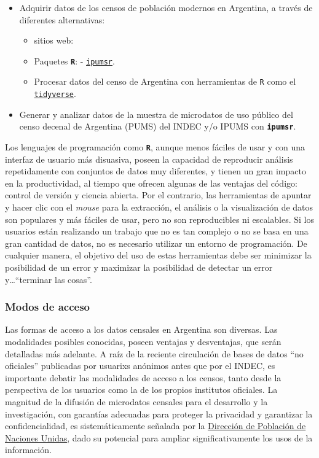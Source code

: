 \documentclass[
]{article}
\providecommand{\tightlist}{%
  \setlength{\itemsep}{0pt}\setlength{\parskip}{0pt}}
\begin{document}
\begin{itemize}
\tightlist
\item
  Adquirir datos de los censos de población modernos en Argentina, a través de diferentes alternativas:

  \begin{itemize}
  \tightlist
  \item
    sitios web:
  \item
    Paquetes \textbf{\texttt{R}}: - \href{https://cran.r-project.org/web/packages/ipumsr/vignettes/ipums.html}{\texttt{ipumsr}}.
  \item
    Procesar datos del censo de Argentina con herramientas de \texttt{R} como el \href{https://www.tidyverse.org/}{\texttt{tidyverse}}.
  \end{itemize}
\item
  Generar y analizar datos de la muestra de microdatos de uso público del censo decenal de Argentina (PUMS) del INDEC y/o IPUMS con \textbf{\texttt{ipumsr}}.
\end{itemize}

Los lenguajes de programación como \textbf{\texttt{R}}, aunque menos fáciles de usar y con una interfaz de usuario más disuasiva, poseen la capacidad de reproducir análisis repetidamente con conjuntos de datos muy diferentes, y tienen un gran impacto en la productividad, al tiempo que ofrecen algunas de las ventajas del código: control de versión y ciencia abierta. Por el contrario, las herramientas de apuntar y hacer clic con el \emph{mouse} para la extracción, el análisis o la visualización de datos son populares y más fáciles de usar, pero no son reproducibles ni escalables. Si los usuarios están realizando un trabajo que no es tan complejo o no se basa en una gran cantidad de datos, no es necesario utilizar un entorno de programación. De cualquier manera, el objetivo del uso de estas herramientas debe ser minimizar la posibilidad de un error y maximizar la posibilidad de detectar un error y\ldots{}``terminar las cosas''.

\hypertarget{modos-de-acceso}{%
\subsubsection{Modos de acceso}\label{modos-de-acceso}}

Las formas de acceso a los datos censales en Argentina son diversas. Las modalidades posibles conocidas, poseen ventajas y desventajas, que serán detalladas más adelante. A raíz de la reciente circulación de bases de datos ``no oficiales'' publicadas por usuarixs anónimos antes que por el INDEC, es importante debatir las modalidades de acceso a los censos, tanto desde la perspectiva de los usuarios como la de los propios institutos oficiales. La magnitud de la difusión de microdatos censales para el desarrollo y la investigación, con garantías adecuadas para proteger la privacidad y garantizar la confidencialidad, es sistemáticamente señalada por la \href{https://www.un.org/development/desa/es/about/desa-divisions/population.html}{Dirección de Población de Naciones Unidas}, dado su potencial para ampliar significativamente los usos de la información.
\end{document}
